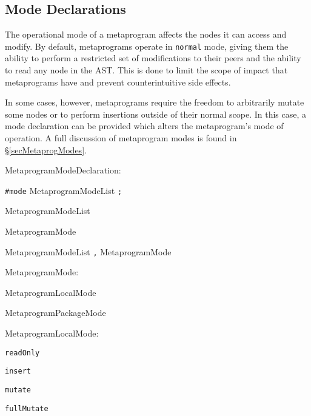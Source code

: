 \documentclass[a4paper,10pt]{report}
\newcommand{\refS}[1]{\hyperref[#1]{\S\ref{#1}}}
\newenvironment{grammar}{
    \begin{list}{}{
        \itshape
        \setlength{\partopsep}{\topsep}
        \setlength{\topsep}{0cm}
    }
}{
    \end{list}
}
\begin{document}
\subsection{Mode Declarations}
\label{secMetaprogPreambleMode}

The operational mode of a metaprogram affects the nodes it can access and modify.  By default, metaprograms operate in \texttt{normal} mode, giving them the ability to perform a restricted set of modifications to their peers and the ability to read any node in the AST.  This is done to limit the scope of impact that metaprograms have and prevent counterintuitive side effects.

In some cases, however, metaprograms require the freedom to arbitrarily mutate some nodes or to perform insertions outside of their normal scope.  In this case, a mode declaration can be provided which alters the metaprogram's mode of operation.  A full discussion of metaprogram modes is found in \refS{secMetaprogModes}.

\begin{grammar}
    \item MetaprogramModeDeclaration:
    \begin{grammar}
        \item \verb`#mode` MetaprogramModeList \verb`;`
    \end{grammar}
\end{grammar}

\begin{grammar}
    \item MetaprogramModeList
    \begin{grammar}
        \item MetaprogramMode
        \item MetaprogramModeList \verb`,` MetaprogramMode
    \end{grammar}
\end{grammar}

\begin{grammar}
    \item MetaprogramMode:
    \begin{grammar}
        \item MetaprogramLocalMode
        \item MetaprogramPackageMode
    \end{grammar}
\end{grammar}

\begin{grammar}
    \item MetaprogramLocalMode:
    \begin{grammar}
        \item \verb`readOnly`
        \item \verb`insert`
        \item \verb`mutate`
        \item \verb`fullMutate`
    \end{grammar}
\end{grammar}
\end{document}
